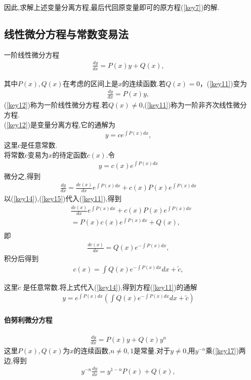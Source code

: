 \documentclass[UTF8]{article}
\begin{document}
因此,求解上述变量分离方程,最后代回原变量即可的原方程(\ref{key7})的解.


\subsection{线性微分方程与常数变易法}
一阶线性微分方程
\begin{align}\label{key11}
\frac{dy}{dx}=P(x)y+Q(x),
\end{align}

其中$P(x),Q(x)$在考虑的区间上是$x$的连续函数.若$Q(x)=0$，(\ref{key11})变为
\begin{align}\label{key12}
\frac{dy}{dx}=P(x)y,
\end{align}
(\ref{key12})称为一阶线性微分方程.若$Q(x) \ne 0$,(\ref{key11})称为一阶非齐次线性微分方程.\\

(\ref{key12})是变量分离方程,它的通解为
\begin{align}\label{key13}
y=ce^{\int P(x)dx},
\end{align}
这里$c$是任意常数.\\
将常数$c$变易为$x$的待定函数$c(x)$.令
\begin{align}\label{key14}
y=c(x)e^{\int P(x)dx}
\end{align}
微分之,得到
\begin{align}\label{key15}
\frac{dy}{dx}=\frac{dc(x)}{dx} e^{\int P(x)dx}+c(x)P(x)e^{\int P(x)dx}
\end{align}
以(\ref{key14}),(\ref{key15})代入(\ref{key11}),得到
\begin{align*}
& \frac{dc(x)}{dx} e^{\int P(x)dx}+c(x)P(x)e^{\int P(x)dx}\\
&=P(x)c(x)e^{\int P(x)dx}+Q(x),\\
\end{align*}
即
\begin{align*}
\frac{dc(x)}{dx}=Q(x)e^{-\int P(x)dx},
\end{align*}
积分后得到
\begin{align*}
c(x)=\int Q(x)e^{- \int P(x)dx}dx+\tilde{c},
\end{align*}

这里$\tilde{c}$ 是任意常数.将上式代入(\ref{key14}),得到方程(\ref{key11})的通解
\begin{align}\label{16}
y=e^{\int P(x)dx}(\int Q(x)e^{-\int P(x)dx}dx+\tilde{c})
\end{align}

\paragraph{伯努利微分方程}
\begin{align}\label{key17}
\frac{dy}{dx}=P(x)y+Q(x)y^n
\end{align}
这里$P(x),Q(x)\text{为}x$的连续函数,$n \ne 0,1$是常量.对于$y \ne 0$,用$y^{-n}$乘(\ref{key17})两边,得到
\begin{align}\label{key18}
y^{-n}\frac{dy}{dx}=y^{1-n}P(x)+Q(x),
\end{align}
\end{document}
